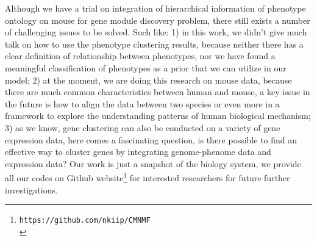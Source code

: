 \documentclass{bmcart}
\begin{document}
Although we have a trial on integration of hierarchical information of phenotype ontology on mouse for gene module discovery problem, there still exists a number of challenging issues to be solved. Such like: 1) in this work, we didn't give much talk on how to use the phenotype clustering results, because neither there has a clear definition of relationship between phenotypes, nor we have found a meaningful classification of phenotypes as a prior that we can utilize in our model; 2) at the moment, we are doing this research on mouse data, because there are much common characteristics between human and mouse, a key issue in the future is how to align the data between two species or even more in a framework to explore the understanding patterns of human biological mechanism; 3) as we know, gene clustering can also be conducted on a variety of gene expression data, here comes a fascinating question, is there possible to find an effective way to cluster genes by integrating genome-phenome data and expression data? Our work is just a snapshot of the biology system, we provide all our codes on Github website\footnote{\texttt{https://github.com/nkiip/CMNMF}\\} for interested researchers for future further investigations.

\end{document}

